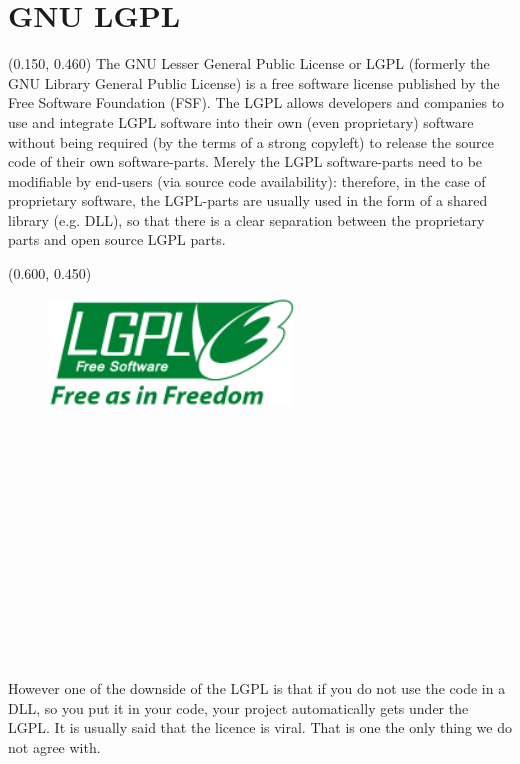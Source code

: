 \documentclass[article]{report}             %
\begin{document}
			\section{GNU LGPL}
\begin{textblock}{0.475}(0.150, 0.460)
				The GNU Lesser General Public License or LGPL (formerly the GNU Library General Public License) is a free software license published by the Free Software Foundation (FSF). The LGPL allows developers and companies to use and integrate LGPL software into their own (even proprietary) software without being required (by the terms of a strong copyleft) to release the source code of their own software-parts. Merely the LGPL software-parts need to be modifiable by end-users (via source code availability): therefore, in the case of proprietary software, the LGPL-parts are usually used in the form of a shared library (e.g. DLL), so that there is a clear separation between the proprietary parts and open source LGPL parts.\\
				\end{textblock}

				\begin{textblock}{0.628}(0.600, 0.450)
					\begin{figure}
						\includegraphics[width=6.5cm]{images/LGPL.png}
					\end{figure}
				\end{textblock}
~\\~\\~\\~\\~\\~\\~\\~\\~\\~\\~\\~\\~\\
				However one of the downside of the LGPL is that if you do not use the code in a DLL, so you put it in your code, your project automatically gets under the LGPL. It is usually said that the licence is viral. That is one the only thing we do not agree with.
\end{document}
